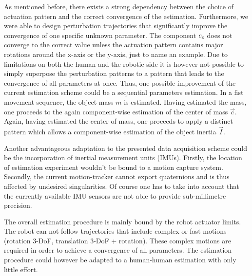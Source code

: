 As mentioned before, there exists a strong dependency between the choice of actuation pattern and the correct convergence of the estimation. Furthermore, we were able to design perturbation trajectories that significantly improve the convergence of one specific unknown parameter. The component $c_{\mathrm{z}}$ does not converge to the correct value unless the actuation pattern contains major rotations around the x-axis or the y-axis, just to name an example. Due to limitations on both the human and the robotic side it is however not possible to simply superpose the perturbation patterns to a pattern that leads to the convergence of all parameters at once. Thus, one possible improvement of the current estimation scheme could be a sequential parameters estimation. In a fist movement sequence, the object mass $m$ is estimated. Having estimated the mass, one proceeds to the again component-wise estimation of the center of mass $\vec{c}$. Again, having estimated the center of mass, one proceeds to apply a distinct pattern which allows a component-wise estimation of the object inertia $\vec{I}$.

Another advantageous adaptation to the presented data acquisition scheme could be the incorporation of inertial measurement units (IMUs). Firstly, the location of estimation experiment wouldn't be bound to a motion capture system. Secondly, the current motion-tracker cannot export quaternions and is thus affected by undesired singularities. Of course one has to take into account that the currently available IMU sensors are not able to provide sub-millimetre precision.

The overall estimation procedure is mainly bound by the robot actuator limits. The robot can not follow trajectories that include complex or fast motions (rotation 3-DoF, translation 3-DoF + rotation). These complex motions are required in order to achieve a convergence of all parameters. The estimation procedure could however be adapted to a human-human estimation with only little effort.
